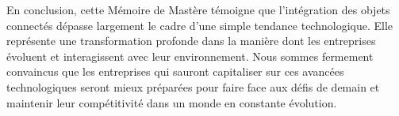 {En conclusion, cette Mémoire de Mastère témoigne que l'intégration des objets connectés dépasse largement le cadre d'une simple tendance technologique. Elle représente une transformation profonde dans la manière dont les entreprises évoluent et interagissent avec leur environnement. Nous sommes fermement convaincus que les entreprises qui sauront capitaliser sur ces avancées technologiques seront mieux préparées pour faire face aux défis de demain et maintenir leur compétitivité dans un monde en constante évolution. \\




}